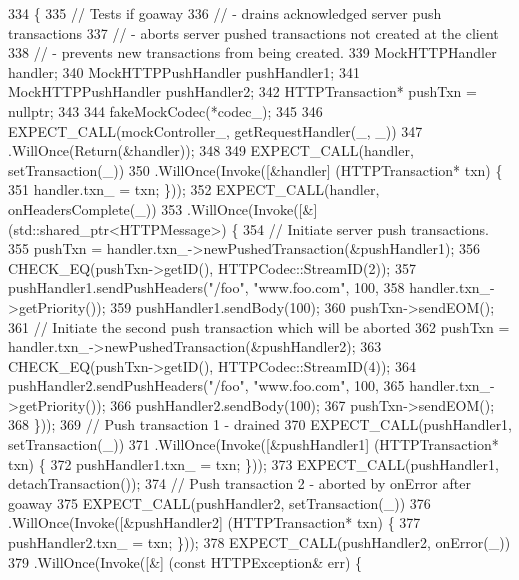 \begin{DoxyCode}
334                                                        \{
335   \textcolor{comment}{// Tests if goaway}
336   \textcolor{comment}{//   - drains acknowledged server push transactions}
337   \textcolor{comment}{//   - aborts server pushed transactions not created at the client}
338   \textcolor{comment}{//   - prevents new transactions from being created.}
339   MockHTTPHandler handler;
340   MockHTTPPushHandler pushHandler1;
341   MockHTTPPushHandler pushHandler2;
342   HTTPTransaction* pushTxn = \textcolor{keyword}{nullptr};
343 
344   fakeMockCodec(*codec\_);
345 
346   EXPECT\_CALL(mockController\_, getRequestHandler(\_, \_))
347     .WillOnce(Return(&handler));
348 
349   EXPECT\_CALL(handler, setTransaction(\_))
350     .WillOnce(Invoke([&handler] (HTTPTransaction* txn) \{
351           handler.txn_ = txn; \}));
352   EXPECT\_CALL(handler, onHeadersComplete(\_))
353     .WillOnce(Invoke([&] (std::shared\_ptr<HTTPMessage>) \{
354           \textcolor{comment}{// Initiate server push transactions.}
355           pushTxn = handler.txn_->newPushedTransaction(&pushHandler1);
356           CHECK\_EQ(pushTxn->getID(), HTTPCodec::StreamID(2));
357           pushHandler1.sendPushHeaders(\textcolor{stringliteral}{"/foo"}, \textcolor{stringliteral}{"www.foo.com"}, 100,
358                                        handler.txn_->getPriority());
359           pushHandler1.sendBody(100);
360           pushTxn->sendEOM();
361           \textcolor{comment}{// Initiate the second push transaction which will be aborted}
362           pushTxn = handler.txn_->newPushedTransaction(&pushHandler2);
363           CHECK\_EQ(pushTxn->getID(), HTTPCodec::StreamID(4));
364           pushHandler2.sendPushHeaders(\textcolor{stringliteral}{"/foo"}, \textcolor{stringliteral}{"www.foo.com"}, 100,
365                                        handler.txn_->getPriority());
366           pushHandler2.sendBody(100);
367           pushTxn->sendEOM();
368         \}));
369   \textcolor{comment}{// Push transaction 1 - drained}
370   EXPECT\_CALL(pushHandler1, setTransaction(\_))
371     .WillOnce(Invoke([&pushHandler1] (HTTPTransaction* txn) \{
372           pushHandler1.txn_ = txn; \}));
373   EXPECT\_CALL(pushHandler1, detachTransaction());
374   \textcolor{comment}{// Push transaction 2 - aborted by onError after goaway}
375   EXPECT\_CALL(pushHandler2, setTransaction(\_))
376     .WillOnce(Invoke([&pushHandler2] (HTTPTransaction* txn) \{
377           pushHandler2.txn_ = txn; \}));
378   EXPECT\_CALL(pushHandler2, onError(\_))
379     .WillOnce(Invoke([&] (\textcolor{keyword}{const} HTTPException& err) \{

\end{DoxyCode}
